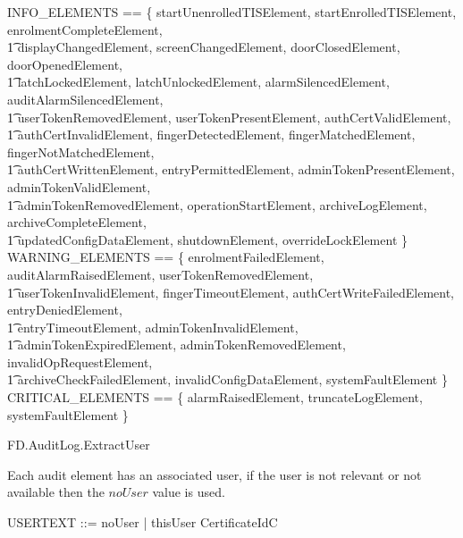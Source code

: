 \begin{zed}
        
\also
        INFO\_ELEMENTS == \{ 
        startUnenrolledTISElement,
        startEnrolledTISElement,
        enrolmentCompleteElement,
\\ \t1        displayChangedElement,
        screenChangedElement,
        doorClosedElement,
        doorOpenedElement,
\\ \t1        latchLockedElement,
        latchUnlockedElement,
        alarmSilencedElement,
        auditAlarmSilencedElement,
\\ \t1      userTokenRemovedElement,
        userTokenPresentElement,
        authCertValidElement,
\\ \t1        authCertInvalidElement,
      fingerDetectedElement,
        fingerMatchedElement,
        fingerNotMatchedElement,
\\ \t1      authCertWrittenElement,
      entryPermittedElement,
      adminTokenPresentElement,
        adminTokenValidElement,
\\ \t1        adminTokenRemovedElement,
        operationStartElement,
      archiveLogElement,
        archiveCompleteElement,
\\ \t1        updatedConfigDataElement,
        shutdownElement,
        overrideLockElement
        \} 
\also
	WARNING\_ELEMENTS == 
        \{
         enrolmentFailedElement,
        auditAlarmRaisedElement,
        userTokenRemovedElement,
\\ \t1         userTokenInvalidElement,
        fingerTimeoutElement,
         authCertWriteFailedElement,
         entryDeniedElement,
\\ \t1        entryTimeoutElement,
         adminTokenInvalidElement,
\\ \t1   adminTokenExpiredElement,
         adminTokenRemovedElement,
       invalidOpRequestElement,
\\ \t1         archiveCheckFailedElement,
        invalidConfigDataElement, 
        systemFaultElement
        \}
\also
	CRITICAL\_ELEMENTS == 
        \{
         alarmRaisedElement,
         truncateLogElement,
         systemFaultElement
        \}
\end{zed}

\begin{traceunit}{FD.AuditLog.ExtractUser}
\end{traceunit}

Each audit element has an associated user, if the user is not relevant
or not available then the $noUser$ value is used.

\begin{zed}
        USERTEXT ::= noUser | thisUser \ldata CertificateIdC \rdata
\end{zed}

